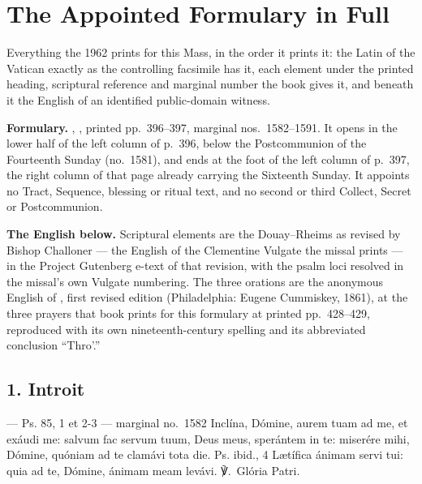 \section*{The Appointed Formulary in Full}

Everything the 1962  prints for this Mass, in the order
it prints it: the Latin of the Vatican  exactly as the
controlling facsimile has it, each element under the printed heading,
scriptural reference and marginal number the book gives it, and beneath it the English of an
identified public-domain witness.

\textbf{Formulary.} ,
, printed pp.~396--397, marginal nos.\ 1582--1591. It opens in
the lower half of the left column of p.~396, below the Postcommunion of the
Fourteenth Sunday (no.~1581), and ends at the foot of the left column of p.~397,
the right column of that page already carrying the Sixteenth Sunday. It appoints
no Tract, Sequence, blessing or ritual text, and no second or third Collect,
Secret or Postcommunion.

\textbf{The English below.} Scriptural elements are the Douay--Rheims as revised
by Bishop Challoner --- the English of the Clementine Vulgate the missal prints
--- in the Project Gutenberg e-text of that revision, with the psalm loci
resolved in the missal's own Vulgate numbering. The three orations are the
anonymous English of , first revised edition (Philadelphia: Eugene
Cummiskey, 1861), at the three prayers that book prints for this formulary at
printed pp.~428--429, reproduced with its own nineteenth-century spelling and its abbreviated
conclusion ``Thro'.''

\elementguard
\subsection*{1. Introit }

\begin{appointedlatin}{ --- Ps. 85, 1 et 2-3 --- marginal no.\ 1582}
Inclína, Dómine, aurem tuam ad me, et exáudi me: salvum fac servum tuum, Deus
meus, sperántem in te: miserére mihi, Dómine, quóniam ad te clamávi tota die.
\textnormal{Ps. ibid., 4} Lætífica ánimam servi tui: quia ad te, Dómine, ánimam
meam levávi. ℣.~Glória Patri.
\end{appointedlatin}

